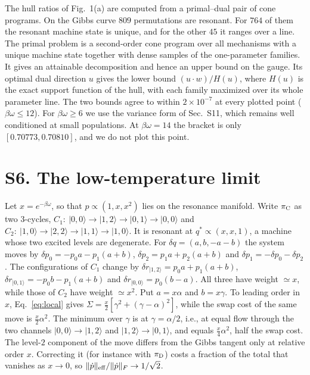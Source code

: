 \documentclass[aps,prl,reprint,superscriptaddress,amsmath,amssymb]{revtex4-2}
\begin{document}
The hull ratios of Fig.~1(a) are computed from a primal--dual pair of cone programs. On the Gibbs curve $809$
permutations are resonant. For $764$ of them the resonant machine state is unique, and for the other $45$ it ranges over
a line. The primal problem is a second-order cone program over all mechanisms with a unique machine state together
with dense samples of the one-parameter families. It gives an attainable decomposition and hence an upper bound on the
gauge. Its optimal dual direction $u$ gives the lower bound $(u\cdot w)/H(u)$, where $H(u)$ is the exact support
function of the hull, with each family maximized over its whole parameter line. The two bounds agree to within
$2\times10^{-7}$ at every plotted point ($\beta\omega\leq12$). For $\beta\omega\geq6$ we use the variance form of
Sec.~S11, which remains well conditioned at small populations. At $\beta\omega=14$ the bracket is only
$[0.70773,0.70810]$, and we do not plot this point.

\section{S6. The low-temperature limit}
Let $x=e^{-\beta\omega}$, so that $p\propto(1,x,x^2)$ lies on the resonance manifold. Write $\pi_{\rm C}$ as two
$3$-cycles,
$C_1:\ |0,0\rangle\to|1,2\rangle\to|0,1\rangle\to|0,0\rangle$ and
$C_2:\ |1,0\rangle\to|2,2\rangle\to|1,1\rangle\to|1,0\rangle$.
It is resonant at $q^*\propto(x,x,1)$, a machine whose two excited levels are degenerate. For $\delta q=(a,b,-a-b)$ the
system moves by
$\delta p_0=-p_0a-p_1(a+b)$, $\delta p_2=p_1a+p_2(a+b)$ and $\delta p_1=-\delta p_0-\delta p_2$.
The configurations of $C_1$ change by
$\delta r_{|1,2\rangle}=p_0a+p_1(a+b)$, $\delta r_{|0,1\rangle}=-p_0b-p_1(a+b)$ and $\delta r_{|0,0\rangle}=p_0(b-a)$.
All three have weight $\simeq x$, while those of $C_2$ have weight $\simeq x^2$. Put $a=x\alpha$ and $b=x\gamma$. To
leading order in $x$, Eq.~\eqref{eq:local} gives
$\Sigma=\tfrac{x}{2}\left[\gamma^2+(\gamma-\alpha)^2\right]$,
while the swap cost of the same move is $\tfrac x2\alpha^2$. The minimum over $\gamma$ is at $\gamma=\alpha/2$, i.e., at
equal flow through the two channels $|0,0\rangle\to|1,2\rangle$ and $|1,2\rangle\to|0,1\rangle$, and equals
$\tfrac x4\alpha^2$, half the swap cost. The level-$2$ component of the move differs from the Gibbs tangent only at
relative order $x$. Correcting it (for instance with $\pi_{\rm D}$) costs a fraction of the total that vanishes as
$x\to0$, so $\|\dot p\|_{\rm eff}/\|\dot p\|_F\to1/\sqrt2$.
\end{document}
